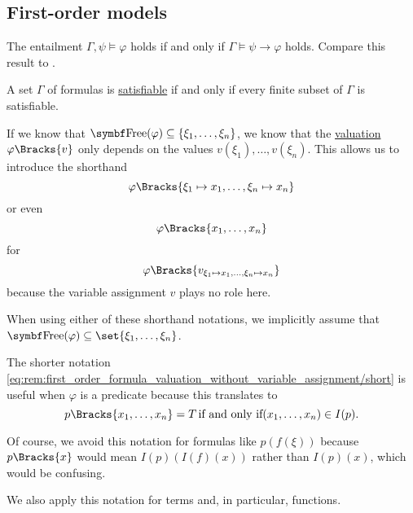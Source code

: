 \subsection{First-order models}\label{subsec:first_order_models}

\begin{theorem}\label{thm:semantic_deduction_theorem}\mcite\cite[thm. 14.53]{OpenLogic20201202}
  The entailment \( \Gamma, \psi \vDash \varphi \) holds if and only if \( \Gamma \vDash \psi \to \varphi \) holds. Compare this result to .
\end{theorem}

\begin{theorem}\label{thm:first_order_compactness_theorem}\mcite\cite[thm. 21.21]{OpenLogic20201202}
  A set \( \Gamma \) of formulas is \hyperref[def:propositional_semantics/satisfiability]{satisfiable} if and only if every finite subset of \( \Gamma \) is satisfiable.
\end{theorem}

\begin{remark}\label{rem:first_order_formula_valuation_without_variable_assignment}
  If we know that \( \bfop{Free}(\varphi) \subseteq \{ \xi_1, \ldots, \xi_n \} \), we know that the \hyperref[def:first_order_valuation/formula_valuation]{valuation} \( \varphi\Bracks{v} \) only depends on the values \( v(\xi_1), \ldots, v(\xi_n) \). This allows us to introduce the shorthand
  \begin{equation}\label{eq:rem:first_order_formula_valuation_without_variable_assignment/long}
    \varphi\Bracks{\xi_1 \mapsto x_1, \ldots, \xi_n \mapsto x_n}
  \end{equation}
  or even
  \begin{equation}\label{eq:rem:first_order_formula_valuation_without_variable_assignment/short}
    \varphi\Bracks{x_1, \ldots, x_n}
  \end{equation}
  for
  \begin{equation*}
    \varphi\Bracks{v_{\xi_1 \mapsto x_1, \ldots, \xi_n \mapsto x_n}}
  \end{equation*}
  because the variable assignment \( v \) plays no role here.

  When using either of these shorthand notations, we implicitly assume that \( \bfop{Free}(\varphi) \subseteq \set{ \xi_1, \ldots, \xi_n } \).

  The shorter notation \eqref{eq:rem:first_order_formula_valuation_without_variable_assignment/short} is useful when \( \varphi \) is a predicate because this translates to
  \begin{equation*}
    p\Bracks{x_1, \ldots, x_n} = T \T{if and only if} (x_1, \ldots, x_n) \in I(p).
  \end{equation*}

  Of course, we avoid this notation for formulas like \( p(f(\xi)) \) because \( p\Bracks{x} \) would mean \( I(p)(I(f)(x)) \) rather than \( I(p)(x) \), which would be confusing.

  We also apply this notation for terms and, in particular, functions.
\end{remark}

